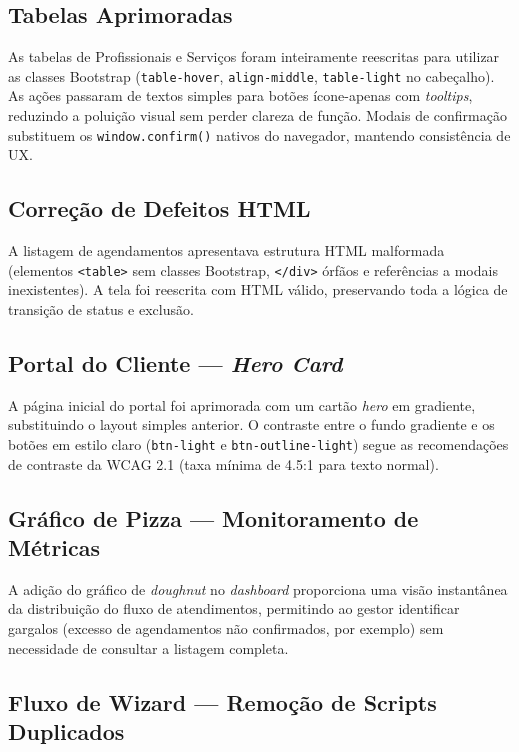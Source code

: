 \subsection{Tabelas Aprimoradas}

As tabelas de Profissionais e Serviços foram inteiramente reescritas para utilizar
as classes Bootstrap (\texttt{table-hover}, \texttt{align-middle},
\texttt{table-light} no cabeçalho). As ações passaram de textos simples para
botões ícone-apenas com \textit{tooltips}, reduzindo a poluição visual sem perder
clareza de função. Modais de confirmação substituem os \texttt{window.confirm()}
nativos do navegador, mantendo consistência de UX.

\subsection{Correção de Defeitos HTML}

A listagem de agendamentos apresentava estrutura HTML malformada (elementos
\texttt{<table>} sem classes Bootstrap, \texttt{</div>} órfãos e referências a
modais inexistentes). A tela foi reescrita com HTML válido, preservando toda a
lógica de transição de status e exclusão.

\subsection{Portal do Cliente — \textit{Hero Card}}

A página inicial do portal foi aprimorada com um cartão \textit{hero} em
gradiente, substituindo o layout simples anterior. O contraste entre o fundo
gradiente e os botões em estilo claro (\texttt{btn-light} e
\texttt{btn-outline-light}) segue as recomendações de contraste da WCAG 2.1
(taxa mínima de 4.5:1 para texto normal).

\subsection{Gráfico de Pizza — Monitoramento de Métricas}

A adição do gráfico de \textit{doughnut} no \textit{dashboard} proporciona uma
visão instantânea da distribuição do fluxo de atendimentos, permitindo ao
gestor identificar gargalos (excesso de agendamentos não confirmados, por
exemplo) sem necessidade de consultar a listagem completa.

\subsection{Fluxo de Wizard — Remoção de Scripts Duplicados}


